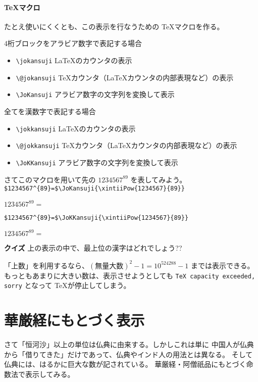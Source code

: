 \documentclass[dvipdfmx]{jsarticle}
\begin{document}
\paragraph{\TeX マクロ}
たとえ使いにくくとも、この表示を行なうための \TeX マクロを作る。
\begin{itembox}[l]{4桁ブロックをアラビア数字で表記する場合}
\begin{itemize}
\item \verb+\jokansuji+ \LaTeX のカウンタの表示
\item \verb+\@jokansuji+ \TeX カウンタ（\LaTeX カウンタの内部表現など）の表示
\item \verb+\JoKansuji+ アラビア数字の文字列を変換して表示
\end{itemize}  
\end{itembox}
\begin{itembox}[l]{全てを漢数字で表記する場合}
\begin{itemize}
\item \verb+\jokkansuji+ \LaTeX のカウンタの表示
\item \verb+\@jokkansuji+ \TeX カウンタ（\LaTeX カウンタの内部表現など）の表示
\item \verb+\JoKKansuji+ アラビア数字の文字列を変換して表示
\end{itemize}  
\end{itembox}
さてこのマクロを用いて先の $1234567^{89}$ を表してみよう。
\newpage
\noindent\verb+$1234567^{89}=$\JoKansuji{\xintiiPow{1234567}{89}}+\par
$1234567^{89}=$
\medskip\par
\noindent\verb+$1234567^{89}=$\JoKKansuji{\xintiiPow{1234567}{89}}+\par
$1234567^{89}=$
\par
\begin{itembox}[l]{\bfseries クイズ}
  \centering
  上の表示の中で、最上位の漢字はどれでしょう??  
\end{itembox}
\par\medskip\noindent
「上数」を利用するなら、$(\text{無量大数})^2-1=10^{524288}-1$ までは表示できる。
もっともあまりに大きい数は、表示させようとしても \verb+TeX capacity exceeded, sorry+
となって \TeX\space が停止してしまう。
\def\thesection{第\kegonknumeral{section}話}
\section{華厳経にもとづく表示}
さて「恒河沙」以上の単位は仏典に由来する。しかしこれは単に
中国人が仏典から「借りてきた」だけであって、仏典やインド人の用法とは異なる。
そして仏典には、はるかに巨大な数が記されている。
華厳経・阿僧祇品にもとづく命数法で表示してみる。
\end{document}
